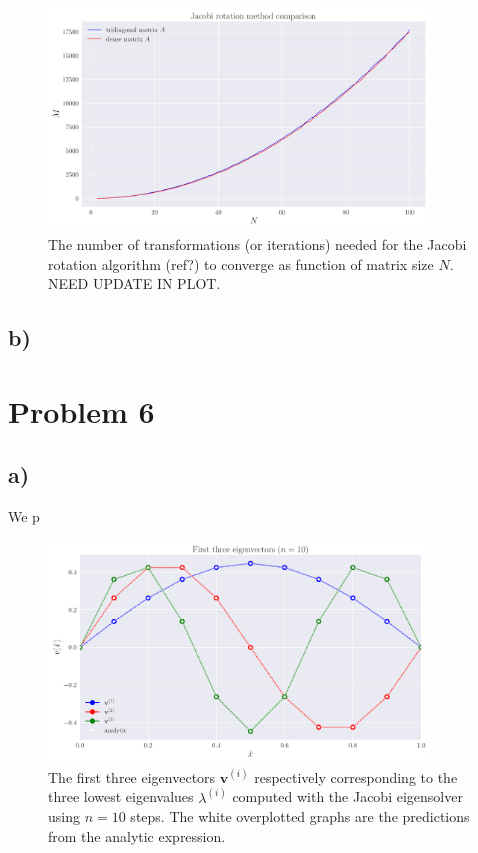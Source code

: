 \documentclass[english,notitlepage,nofootinbib]{revtex4-1}  %
\renewcommand{\vec}{\mathbf}
\begin{document}
\begin{figure}[h!]
    \centering
    \includegraphics[width=0.9\textwidth]{jacobi_comparison.pdf}
    \caption{The number of transformations (or iterations) needed for the Jacobi rotation algorithm (ref?) to converge as function of matrix size $N$. NEED UPDATE IN PLOT.}\label{fig:p5_transformations_per_N}
\end{figure}


\subsection*{b)}
\section*{Problem 6}


\subsection*{a)}
We p

\begin{figure}[h!]
    \centering
    \includegraphics[width=0.9\textwidth]{solution_10steps.pdf}
    \caption{The first three eigenvectors $\vec{v}^{(i)}$ respectively corresponding to the three lowest eigenvalues $\lambda^{(i)}$ computed with the Jacobi eigensolver using $n=10$ steps. The white overplotted graphs are the predictions from the analytic expression.}\label{fig:p6_solution_10steps}
\end{figure}
\end{document}
